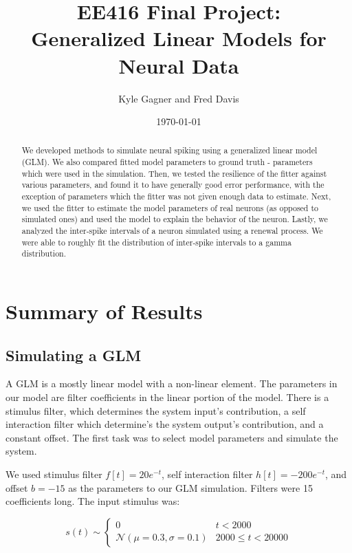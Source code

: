 \documentclass[letterpaper,titlepage,10pt]{article}
\title{EE416 Final Project:\\Generalized Linear Models for Neural Data}
\date{\today}
\author{Kyle Gagner and Fred Davis}
\begin{document}
\maketitle

\begin{abstract}

We developed methods to simulate neural spiking using a generalized linear model (GLM). We also compared fitted model
parameters to ground truth - parameters which were used in the simulation. Then, we tested the resilience of the fitter
against various parameters, and found it to have generally good error performance, with the exception of parameters
which the fitter was not given enough data to estimate. Next, we used the fitter to estimate the model parameters of
real neurons (as opposed to simulated ones) and used the model to explain the behavior of the neuron. Lastly, we
analyzed the inter-spike intervals of a neuron simulated using a renewal process. We were able to roughly fit the
distribution of inter-spike intervals to a gamma distribution.

\end{abstract}

\section{Summary of Results}

\subsection{Simulating a GLM}

A GLM is a mostly linear model with a non-linear element. The parameters in our model are filter coefficients in the
linear portion of the model. There is a stimulus filter, which determines the system input's contribution, a self
interaction filter which determine's the system output's contribution, and a constant offset. The first task was to
select model parameters and simulate the system.

We used stimulus filter $f[t]=20e^{-t}$, self interaction filter $h[t]=-200e^{-t}$, and offset $b=-15$ as the
parameters to our GLM simulation. Filters were 15 coefficients long. The input stimulus was:

$$s(t)\sim
\begin{cases}
0 & t < 2000\\
\mathcal{N}(\mu=0.3, \sigma=0.1) & 2000 \leq t < 20000
\end{cases}$$
\end{document}

